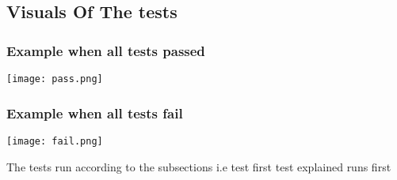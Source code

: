 \documentclass{article}
\begin{document}
\subsection{Visuals Of The tests}
\subsubsection{Example when all tests passed}
\texttt{[image: pass.png]}
\subsubsection{Example when all tests fail}
\texttt{[image: fail.png]}

\newline The tests run according to the subsections i.e test first test explained runs first
\end{document}
